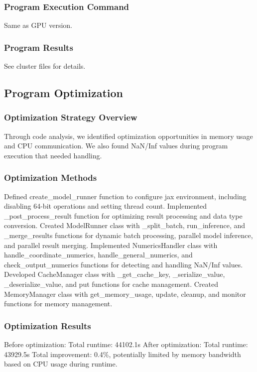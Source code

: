 \documentclass[a4paper,12pt]{article}
\begin{document}
\subsubsection{Program Execution Command}
Same as GPU version.

\subsubsection{Program Results}
See cluster files for details.

\subsection{Program Optimization}

\subsubsection{Optimization Strategy Overview}
Through code analysis, we identified optimization opportunities in memory usage and CPU communication. We also found NaN/Inf values during program execution that needed handling.

\subsubsection{Optimization Methods}
Defined create\_model\_runner function to configure jax environment, including disabling 64-bit operations and setting thread count. Implemented \_post\_process\_result function for optimizing result processing and data type conversion. Created ModelRunner class with \_split\_batch, run\_inference, and \_merge\_results functions for dynamic batch processing, parallel model inference, and parallel result merging. Implemented NumericsHandler class with handle\_coordinate\_numerics, handle\_general\_numerics, and check\_output\_numerics functions for detecting and handling NaN/Inf values. Developed CacheManager class with \_get\_cache\_key, \_serialize\_value, \_deserialize\_value, and put functions for cache management. Created MemoryManager class with get\_memory\_usage, update, cleanup, and monitor functions for memory management.

\subsubsection{Optimization Results}
Before optimization: Total runtime: 44102.1s
After optimization: Total runtime: 43929.5s
Total improvement: 0.4\%, potentially limited by memory bandwidth based on CPU usage during runtime.
\end{document}
